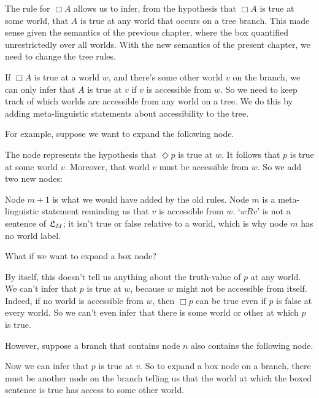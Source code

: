 \bigskip
\noindent
The rule for $\Box A$ allows us to infer, from the hypothesis that $\Box A$ is
true at some world, that $A$ is true at any world that occurs on a tree branch.
This made sense given the semantics of the previous chapter, where the box
quantified unrestrictedly over all worlds. With the new semantics of the present
chapter, we need to change the tree rules.

If $\Box A$ is true at a world $w$, and there's some other world $v$ on the
branch, we can only infer that $A$ is true at $v$ if $v$ is accessible from $w$.
So we need to keep track of which worlds are accessible from any world on a
tree. We do this by adding meta-linguistic statements about accessibility to the
tree.

For example, suppose we want to expand the following node.
%
\begin{center}
\end{center}
%
The node represents the hypothesis that $\Diamond p$ is true at $w$.
It follows that $p$ is true at some world $v$. Moreover, that world
$v$ must be accessible from $w$. So we add two new nodes:

\begin{center}
\end{center}
%
Node $m+1$ is what we would have added by the old rules. Node $m$ is a
meta-linguistic statement reminding us that $v$ is accessible from
$w$. `$wRv$' is not a sentence of $\mathfrak{L}_M$; it isn't true or false
relative to a world, which is why node $m$ has no world label.

What if we want to expand a box node?
%
\begin{center}
\end{center}
%
By itself, this doesn't tell us anything about the truth-value of $p$
at any world. We can't infer that $p$ is true at $w$, because $w$
might not be accessible from itself. Indeed, if no world is accessible
from $w$, then $\Box p$ can be true even if $p$ is false at every
world. So we can't even infer that there is some world or other at
which $p$ is true.

However, suppose a branch that contains node $n$ also contains the
following node.
\begin{center}
\end{center}
Now we can infer that $p$ is true at $v$. So to expand a box node on a
branch, there must be another node on the branch telling us that
the world at which the boxed sentence is true has access to some
other world.

